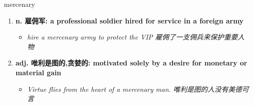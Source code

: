 
\begin{frame}
{\huge mercenary}
\begin{center}
\begin{enumerate}\Large
  \item \textbf{n. 雇佣军: a professional soldier hired for service in a foreign army}
  \begin{itemize}
    \item \em{\Large{hire a mercenary army to protect the VIP 雇佣了一支佣兵来保护重要人物}}
  \end{itemize}
  \item \textbf{adj. 唯利是图的,贪婪的: motivated solely by a desire for monetary or material gain}
  \begin{itemize}
    \item \em{\Large{Virtue flies from the heart of a mercenary man. 唯利是图的人没有美德可言}}
  \end{itemize}
\end{enumerate}
\end{center}
\end{frame}
